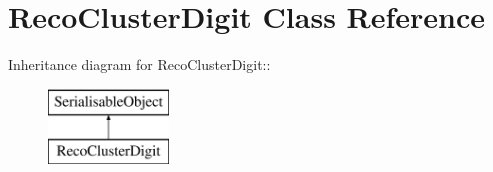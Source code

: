 \hypertarget{classRecoClusterDigit}{
\section{RecoClusterDigit Class Reference}
\label{classRecoClusterDigit}
}
Inheritance diagram for RecoClusterDigit::\begin{figure}[H]
\begin{center}
\leavevmode
\includegraphics[height=2cm]{classRecoClusterDigit}
\end{center}
\end{figure}
